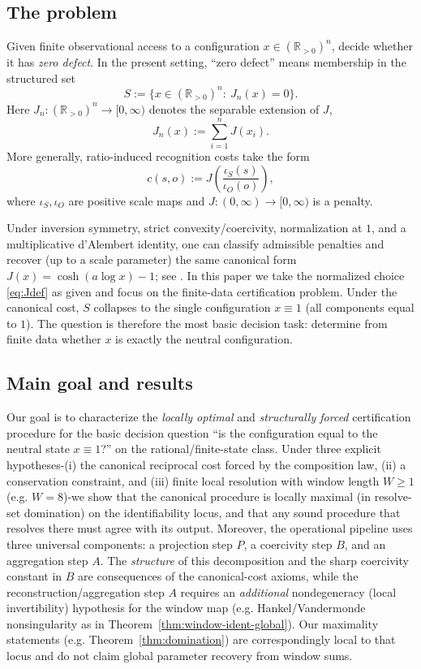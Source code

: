 \documentclass[11pt,reqno]{amsart}
\theoremstyle{definition}
\theoremstyle{remark}
\newcommand{\Rp}{\mathbb{R}_{>0}}
\newcommand{\1}{\mathbf{1}}
\begin{document}
\subsection{The problem}
Given finite observational access to a configuration $x\in(\Rp)^n$, decide whether it has
\emph{zero defect}. In the present setting, ``zero defect'' means membership in the structured
set
\[
S:=\{x\in(\Rp)^n:\ J_n(x)=0\}.
\]
\noindent Here \(J_n:(\Rp)^n\to[0,\infty)\) denotes the separable extension of \(J\),
\begin{equation}\label{eq:Jn}
J_n(x):=\sum_{i=1}^n J(x_i).
\end{equation}
More generally, ratio-induced recognition costs take the form
\begin{equation}\label{eq:cso}
c(s,o):=J\!\left(\frac{\iota_S(s)}{\iota_O(o)}\right),
\end{equation}
where $\iota_S,\iota_O$ are positive scale maps and $J:(0,\infty)\to[0,\infty)$ is a penalty.

Under inversion symmetry, strict convexity/coercivity, normalization at $1$, and a multiplicative
d'Alembert identity, one can classify admissible penalties and recover (up to a scale parameter) the same
canonical form $J(x)=\cosh(a\log x)-1$; see \cite{washburnbarghi2026RCC}. In this paper we take the
normalized choice \eqref{eq:Jdef} as given and focus on the finite-data certification problem. Under the canonical cost, $S$ collapses to the single configuration $x\equiv 1$ (all components
equal to $1$). The question is therefore the most basic decision task: determine from finite data
whether $x$ is exactly the neutral configuration.
\subsection{Main goal and results}

Our goal is to characterize the \emph{locally optimal} and \emph{structurally forced} certification procedure for the basic decision question ``is the configuration equal to the neutral state $x\equiv 1$?'' on the rational/finite-state class. Under three explicit hypotheses-(i) the canonical reciprocal cost forced by the composition law, (ii) a conservation constraint, and (iii) finite local resolution with window length $W\ge 1$ (e.g. $W=8$)-we show that the canonical procedure is locally maximal (in resolve-set domination) on the identifiability locus, and that any sound procedure that resolves there must agree with its output. Moreover, the operational pipeline uses three universal components: a projection step $P$, a coercivity step $B$, and an aggregation step $A$. The \emph{structure} of this decomposition and the sharp coercivity constant in $B$ are consequences of the canonical-cost axioms, while the reconstruction/aggregation step $A$ requires an \emph{additional} nondegeneracy (local invertibility) hypothesis for the window map (e.g. Hankel/Vandermonde nonsingularity as in Theorem~\ref{thm:window-ident-global}). Our maximality statements (e.g. Theorem~\ref{thm:domination}) are correspondingly local to that locus and do not claim global parameter recovery from window sums.
\end{document}
